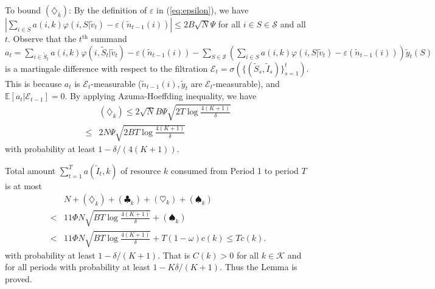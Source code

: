 \documentclass{article}
\theoremstyle{definition}
\newcommand{\EEE}{\mathbb{E}}
\newcommand{\eee}{\mathcal{E}}
\newcommand{\KKK}{\mathcal{K}}
\newcommand{\SSS}{\mathcal{S}}
\begin{document}
To bound $(\diamondsuit_k)$: By the definition of $\varepsilon$ in (\ref{eq:epsilon}), we have $\left|\sum_{i\in S} a(i,k) \varphi(i, S|\tilde{v}_t) - \varepsilon(\tilde{n}_{t-1}(i))\right| \leq 2B\sqrt{N}\Psi$ for all $i\in S\in\SSS$ and all $t$. Observe that the $t^\text{th}$ summand $a_t = \sum_{i\in \tilde{S}_t} a(i,k) \varphi(i, \tilde{S}_t|\tilde{v}_t) - \varepsilon(\tilde{n}_{t-1}(i)) - \sum_{S\in\SSS}\left(\sum_{i\in S} a(i,k) \varphi(i, S|\tilde{v}_t) - \varepsilon(\tilde{n}_{t-1}(i))\right)\tilde{y}_t(S) $ is a martingale difference with respect to the filtration $\eee_t = \sigma(\{(\tilde{S}_s, \tilde{I}_s)\}^t_{s = 1})$. This is because $a_t$ is $\eee_t$-measurable ($\tilde{n}_{t-1}(i), \tilde{y}_t$ are $\eee_t$-measurable), and $\EEE[a_t | \eee_{t-1}] = 0$. By applying Azuma-Hoeffding inequality, we have
\begin{align*}
&(\diamondsuit_k) \leq 2\sqrt{N}B\Psi\sqrt{2T\log{\frac{4(K+1)}{\delta}}} \nonumber\\
\leq & 2N\Psi\sqrt{2BT\log\frac{4(K+1)}{\delta}}
\end{align*}
with probability at least $1 - \delta/(4(K+1))$.

Total amount $\sum^T_{t=1}a(\tilde{I}_t, k)$ of resource $k$ consumed from Period 1 to period $T$ is at most
\begin{align*}
&N + (\diamondsuit_k) + (\clubsuit_k) + (\heartsuit_k) + (\spadesuit_k)\\ 
< & 11\Phi N\sqrt{BT\log{\frac{4(K+1)}{\delta}}} + (\spadesuit_k) \\
< &11\Phi N\sqrt{BT\log{\frac{4(K+1)}{\delta}}} + T(1-\omega)c(k) \leq Tc(k).
\end{align*}
with probability at least $1- \delta/(K+1)$. That is $C(k) > 0$ for all $k\in \KKK$ and for all periods with probability at least $1- K\delta/(K+1)$. Thus the Lemma is proved.



\end{document}
